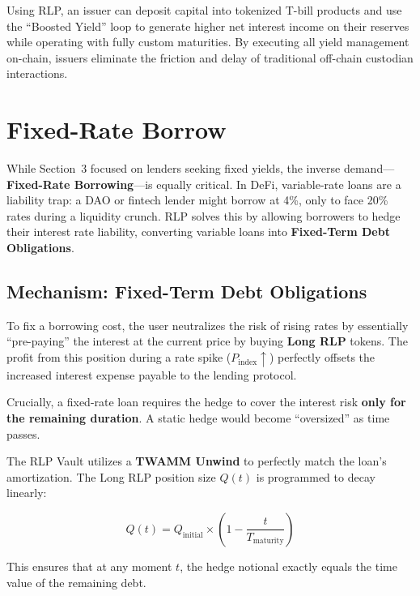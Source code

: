 \documentclass[12pt]{article}
\begin{document}
Using RLP, an issuer can deposit capital into tokenized T-bill products and use the ``Boosted Yield'' loop to generate higher net interest income on their reserves while operating with fully custom maturities. By executing all yield management on-chain, issuers eliminate the friction and delay of traditional off-chain custodian interactions.

\section{Fixed-Rate Borrow}

While Section~3 focused on lenders seeking fixed yields, the inverse demand---\textbf{Fixed-Rate Borrowing}---is equally critical. In DeFi, variable-rate loans are a liability trap: a DAO or fintech lender might borrow at 4\%, only to face 20\% rates during a liquidity crunch. RLP solves this by allowing borrowers to hedge their interest rate liability, converting variable loans into \textbf{Fixed-Term Debt Obligations}.

\subsection{Mechanism: Fixed-Term Debt Obligations}

To fix a borrowing cost, the user neutralizes the risk of rising rates by essentially ``pre-paying'' the interest at the current price by buying \textbf{Long RLP} tokens. The profit from this position during a rate spike ($P_{\text{index}} \uparrow$) perfectly offsets the increased interest expense payable to the lending protocol.

Crucially, a fixed-rate loan requires the hedge to cover the interest risk \textbf{only for the remaining duration}. A static hedge would become ``oversized'' as time passes.

The RLP Vault utilizes a \textbf{TWAMM Unwind} to perfectly match the loan's amortization. The Long RLP position size $Q(t)$ is programmed to decay linearly:

\begin{equation}
    Q(t) = Q_{\text{initial}} \times \left(1 - \frac{t}{T_{\text{maturity}}}\right)
\end{equation}

This ensures that at any moment $t$, the hedge notional exactly equals the time value of the remaining debt.
\end{document}
